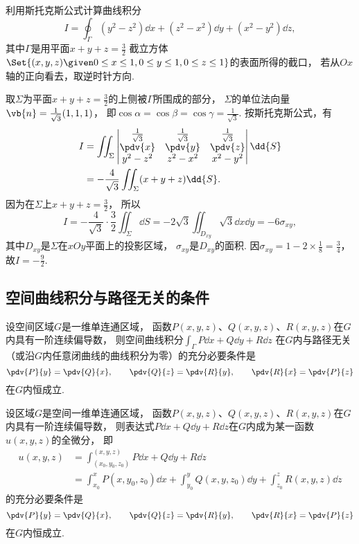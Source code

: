 \begin{example}
利用斯托克斯公式计算曲线积分\[
	I = \oint_\Gamma (y^2-z^2)\dd{x}+(z^2-x^2)\dd{y}+(x^2-y^2)\dd{z},
\]
其中\(\Gamma\)是用平面\(x+y+z=\frac32\)
截立方体\(\Set{(x,y,z)\given0\leq x\leq1,0\leq y\leq1,0\leq z\leq1}\)的表面所得的截口，
若从\(Ox\)轴的正向看去，取逆时针方向.
\begin{solution}
取\(\Sigma\)为平面\(x+y+z=\frac32\)的上侧被\(\Gamma\)所围成的部分，
\(\Sigma\)的单位法向量\(\vb{n}=\frac1{\sqrt3}(1,1,1)\)，
即\(\cos\alpha=\cos\beta=\cos\gamma=\frac1{\sqrt3}\).
按斯托克斯公式，有\begin{align*}
	I &= \iint_\Sigma \begin{vmatrix}
		\frac1{\sqrt3} & \frac1{\sqrt3} & \frac1{\sqrt3} \\
		\pdv{x} & \pdv{y} & \pdv{z} \\
		y^2-z^2 & z^2-x^2 & x^2-y^2
	\end{vmatrix} \dd{S} \\
	&= -\frac4{\sqrt3} \iint_\Sigma (x+y+z) \dd{S}.
\end{align*}
因为在\(\Sigma\)上\(x+y+z=\frac32\)，
所以\[
	I = -\frac4{\sqrt3} \cdot \frac32 \iint_\Sigma \dd{S}
	= -2\sqrt3 \iint_{D_{xy}} \sqrt3 \dd{x}\dd{y}
	= -6 \sigma_{xy},
\]
其中\(D_{xy}\)是\(\Sigma\)在\(xOy\)平面上的投影区域，
\(\sigma_{xy}\)是\(D_{xy}\)的面积.
因\(\sigma_{xy} = 1-2\times\frac18=\frac34\)，
故\(I=-\frac92\).
\end{solution}
\end{example}

\subsection{空间曲线积分与路径无关的条件}
\begin{theorem}\label{theorem:线积分与面积分.空间曲线积分与路径无关的条件}
设空间区域\(G\)是一维单连通区域，
函数\(P(x,y,z)\)、\(Q(x,y,z)\)、\(R(x,y,z)\)在\(G\)内具有一阶连续偏导数，
则空间曲线积分\(\int_\Gamma P\dd{x}+Q\dd{y}+R\dd{z}\)
在\(G\)内与路径无关（或沿\(G\)内任意闭曲线的曲线积分为零）的充分必要条件是\[
	\pdv{P}{y}=\pdv{Q}{x}, \qquad
	\pdv{Q}{z}=\pdv{R}{y}, \qquad
	\pdv{R}{x}=\pdv{P}{z}
\]在\(G\)内恒成立.
\end{theorem}

\begin{theorem}\label{theorem:线积分与面积分.与路径无关的空间曲线积分}
设区域\(G\)是空间一维单连通区域，
函数\(P(x,y,z)\)、\(Q(x,y,z)\)、\(R(x,y,z)\)在\(G\)内具有一阶连续偏导数，
则表达式\(P\dd{x}+Q\dd{y}+R\dd{z}\)在\(G\)内成为某一函数\(u(x,y,z)\)的全微分，
即\begin{align*}
	u(x,y,z)
	&= \int_{(x_0,y_0,z_0)}^{(x,y,z)}
	P\dd{x}+Q\dd{y}+R\dd{z} \\
	&= \int_{x_0}^x P(x,y_0,z_0) \dd{x}
	+ \int_{y_0}^y Q(x,y,z_0) \dd{y}
	+ \int_{z_0}^z R(x,y,z) \dd{z}
\end{align*}的充分必要条件是\[
	\pdv{P}{y}=\pdv{Q}{x}, \qquad
	\pdv{Q}{z}=\pdv{R}{y}, \qquad
	\pdv{R}{x}=\pdv{P}{z}
\]在\(G\)内恒成立.
\end{theorem}

